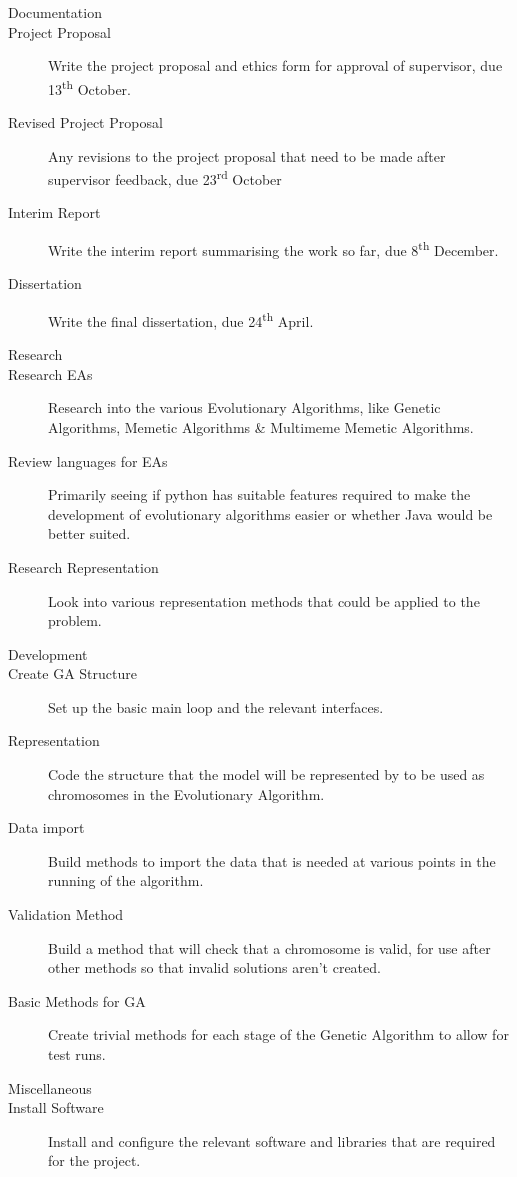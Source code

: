 \documentclass{article}
\begin{document}
\begin{description}
\item [\large{Documentation}]
\item [Project Proposal] Write the project proposal and ethics form for approval of supervisor, due 13\textsuperscript{th} October.
\item [Revised Project Proposal] Any revisions to the project proposal that need to be made after supervisor feedback, due 23\textsuperscript{rd} October
\item [Interim Report] Write the interim report summarising the work so far, due 8\textsuperscript{th} December.
\item [Dissertation] Write the final dissertation, due 24\textsuperscript{th} April.

\item [\large{Research}]
\item [Research EAs] Research into the various Evolutionary Algorithms, like Genetic Algorithms, Memetic Algorithms \& Multimeme Memetic Algorithms.
\item [Review languages for EAs] Primarily seeing if python has suitable features required to make the development of evolutionary algorithms easier or whether Java would be better suited.
\item [Research Representation] Look into various representation methods that could be applied to the problem.

\item [\large{Development}]
\item [Create GA Structure] Set up the basic main loop and the relevant interfaces.
\item [Representation] Code the structure that the model will be represented by to be used as chromosomes in the Evolutionary Algorithm.
\item [Data import] Build methods to import the data that is needed at various points in the running of the algorithm.
\item [Validation Method] Build a method that will check that a chromosome is valid, for use after other methods so that invalid solutions aren't created.
\item [Basic Methods for GA] Create trivial methods for each stage of the Genetic Algorithm to allow for test runs.

\item [\large{Miscellaneous}]
\item [Install Software] Install and configure the relevant software and libraries that are required for the project.


\end{description}
\end{document}
